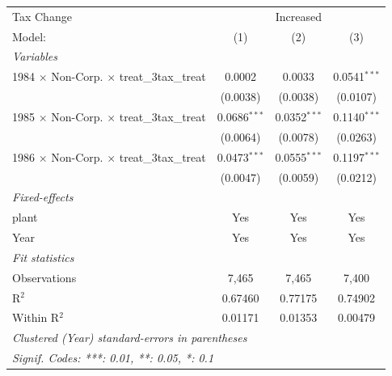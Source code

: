 \documentclass[
  12pt]{article}
\theoremstyle{definition}
\theoremstyle{remark}
\begin{document}
\begin{table}
\begin{minipage}{\linewidth}
\begin{tabular}{lccc}
   Tax Change & \multicolumn{3}{c}{Increased} \\ 
   Model:                                                  & (1)            & (2)            & (3)\\  
   \midrule
   \emph{Variables}\\
   1984 $\times$ Non-Corp. $\times$ treat\_3tax\_treat     & 0.0002         & 0.0033         & 0.0541$^{***}$\\   
                                                           & (0.0038)       & (0.0038)       & (0.0107)\\   
   1985 $\times$ Non-Corp. $\times$ treat\_3tax\_treat     & 0.0686$^{***}$ & 0.0352$^{***}$ & 0.1140$^{***}$\\   
                                                           & (0.0064)       & (0.0078)       & (0.0263)\\   
   1986 $\times$ Non-Corp. $\times$ treat\_3tax\_treat     & 0.0473$^{***}$ & 0.0555$^{***}$ & 0.1197$^{***}$\\   
                                                           & (0.0047)       & (0.0059)       & (0.0212)\\   
   \midrule
   \emph{Fixed-effects}\\
   plant                                                   & Yes            & Yes            & Yes\\  
   Year                                                    & Yes            & Yes            & Yes\\  
   \midrule
   \emph{Fit statistics}\\
   Observations                                            & 7,465          & 7,465          & 7,400\\  
   R$^2$                                                   & 0.67460        & 0.77175        & 0.74902\\  
   Within R$^2$                                            & 0.01171        & 0.01353        & 0.00479\\  
   \midrule \midrule
   \multicolumn{4}{l}{\emph{Clustered (Year) standard-errors in parentheses}}\\
   \multicolumn{4}{l}{\emph{Signif. Codes: ***: 0.01, **: 0.05, *: 0.1}}\\
\end{tabular}
\par\endgroup

\end{minipage}%

\end{table}%
\end{document}
